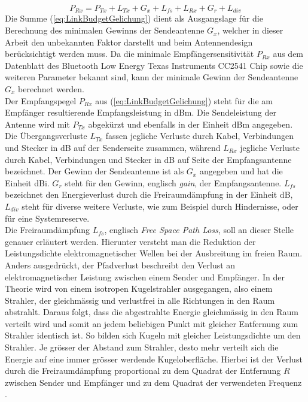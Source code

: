 \begin{equation}
P_{Rx} = P_{Tx}+L_{Tx}+G_{x}+L_{fs}+L_{Rx}+G_{r}+L_{div}\label{eq:LinkBudgetGelichung}
\end{equation}
Die Summe (\ref{eq:LinkBudgetGelichung}) dient als Ausgangslage für die Berechnung des minimalen Gewinns der Sendeantenne $G_{x}$, welcher in dieser Arbeit den unbekannten Faktor darstellt und beim Antennendesign berücksichtigt werden muss. Da die minimale Empfängersensitivität $P_{Rx}$ aus dem Datenblatt des Bluetooth Low Energy Texas Instruments CC2541 Chip sowie die weiteren Parameter bekannt sind, kann der minimale Gewinn der Sendeantenne $G_{x}$ berechnet werden. \\

Der Empfangspegel $P_{Rx}$ aus (\ref{eq:LinkBudgetGelichung}) steht für die am Empfänger resultierende Empfangsleistung in dBm. Die Sendeleistung der Antenne wird mit $P_{Tx}$ abgekürzt und ebenfalls in der Einheit dBm angegeben. Die Übergangsverluste $L_{Tx}$ fassen jegliche Verluste durch Kabel, Verbindungen und Stecker in dB auf der Senderseite zusammen, während $L_{Rx}$ jegliche Verluste durch Kabel, Verbindungen und Stecker in dB auf Seite der Empfangsantenne bezeichnet. Der Gewinn der Sendeantenne ist als $G_{x}$ angegeben und hat die Einheit dBi. $G_{r}$ steht für den Gewinn, englisch \textit{gain}, der Empfangsantenne. $L_{fs}$ bezeichnet den Energieverlust durch die Freiraumdämpfung in der Einheit dB, $L_{div}$ steht für diverse weitere Verluste, wie zum Beispiel durch Hindernisse, oder für eine Systemreserve. \\

Die Freiraumdämpfung $L_{fs}$, englisch \textit{Free Space Path Loss}, soll an dieser Stelle genauer erläutert werden. Hierunter versteht man die Reduktion der Leistungsdichte elektromagnetischer Wellen bei der Ausbreitung im freien Raum. Anders ausgedrückt, der Pfadverlust beschreibt den Verlust an elektromagnetischer Leistung zwischen einem Sender und Empfänger. In der Theorie wird von einem isotropen Kugelstrahler ausgegangen, also einem Strahler, der gleichmässig und verlustfrei in alle Richtungen in den Raum abstrahlt. Daraus folgt, dass die abgestrahlte Energie gleichmässig in den Raum verteilt wird und somit an jedem beliebigen Punkt mit gleicher Entfernung zum Strahler identisch ist. So bilden sich Kugeln mit gleicher Leistungsdichte um den Strahler. Je grösser der Abstand zum Strahler, desto mehr verteilt sich die Energie auf eine immer grösser werdende Kugeloberfläche. Hierbei ist der Verlust durch die Freiraumdämpfung proportional zu dem Quadrat der Entfernung $R$ zwischen Sender und Empfänger und zu dem Quadrat der verwendeten Frequenz \cite{linkbudget}.
\clearpage
\newpage

